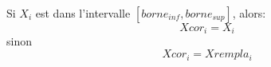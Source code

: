 
Si $X_i$ est dans l'intervalle $[borne_{inf}, borne_{sup}]$, alors:
  \[Xcor_i = X_i\]
sinon
  \[Xcor_i = Xrempla_i\]

